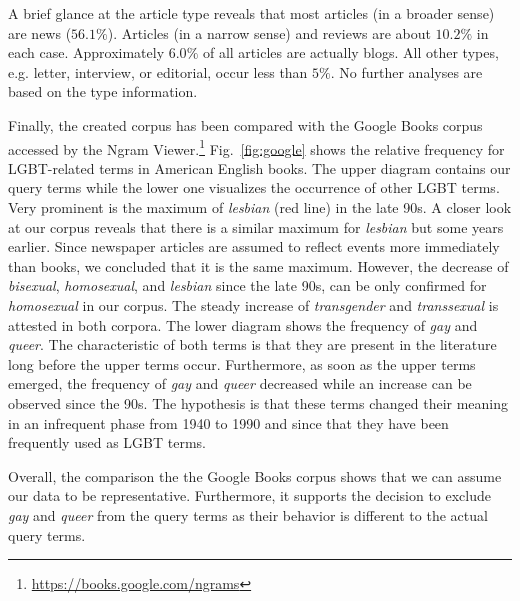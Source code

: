 \documentclass[10pt,a4paper,twocolumn]{scrartcl}
\begin{document}
A brief glance at the article type reveals that most articles (in a broader sense) are news ($56.1\%$). Articles (in a narrow sense) and reviews are about $10.2\%$ in each case. Approximately $6.0\%$ of all articles are actually blogs. All other types, e.g. letter, interview, or editorial, occur less than $5\%$. No further analyses are based on the type information.

Finally, the created corpus has been compared with the Google Books corpus accessed by the Ngram Viewer.\footnote{\url{https://books.google.com/ngrams}} Fig.~\ref{fig:google} shows the relative frequency for LGBT-related terms in American English books. The upper diagram contains our query terms while the lower one visualizes the occurrence of other LGBT terms. Very prominent is the maximum of \textit{lesbian} (red line) in the late 90s. A closer look at our corpus reveals that there is a similar maximum for \textit{lesbian} but some years earlier. Since newspaper articles are assumed to reflect events more immediately than books, we concluded that it is the same maximum. However, the decrease of \textit{bisexual}, \textit{homosexual}, and \textit{lesbian} since the late 90s, can be only confirmed for \textit{homosexual} in our corpus. The steady increase of \textit{transgender} and \textit{transsexual} is attested in both corpora. The lower diagram shows the frequency of \textit{gay} and \textit{queer}. The characteristic of both terms is that they are present in the literature long before the upper terms occur. Furthermore, as soon as the upper terms emerged, the frequency of \textit{gay} and \textit{queer} decreased while an increase can be observed since the 90s. The hypothesis is that these terms changed their meaning in an infrequent phase from 1940 to 1990 and since that they have been frequently used as LGBT terms.

Overall, the comparison the the Google Books corpus shows that we can assume our data to be representative. Furthermore, it supports the decision to exclude \textit{gay} and \textit{queer} from the query terms as their behavior is different to the actual query terms.
\end{document}
